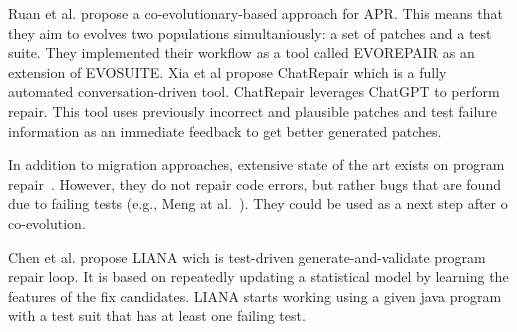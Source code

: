 Ruan et al. \cite{10638555} propose a co-evolutionary-based approach for APR. This means that they aim to evolves two populations simultaniously: a set of patches and a test suite. They implemented their workflow as a tool called EVOREPAIR as an extension of EVOSUITE.
 Xia et al \cite{10.1145/3650212.3680323} propose ChatRepair which is a fully automated conversation-driven tool. ChatRepair leverages ChatGPT to perform repair. This tool uses previously incorrect and plausible patches and test failure information as an immediate feedback to get better generated patches.

 In addition to migration approaches, extensive state of the art exists on program repair~\cite{goues2019automated,liu2020efficiency,monperrus2018automatic,gazzola2017automatic}. However, they do not repair code errors, but rather bugs that are found due to failing tests (e.g., Meng at al.~\cite{10.5555/2486788.2486855}). 
 They could be used as a next step after o co-evolution. 
 
Chen et al. \cite{9749899} propose LIANA wich is test-driven generate-and-validate program repair loop. It is based on repeatedly updating a statistical model by learning the features of the fix candidates. LIANA starts working using a given java program with a test suit that has at least one failing test. 
 


 
 
